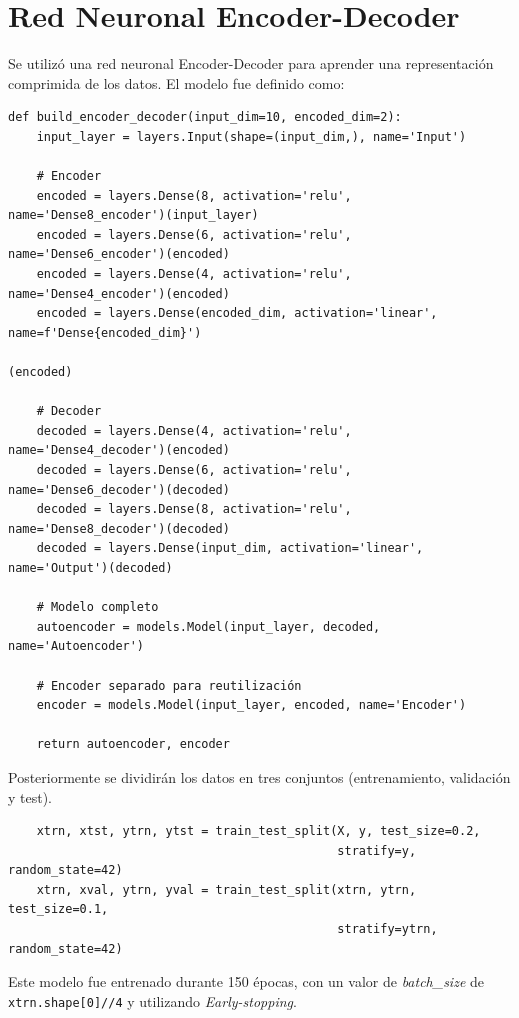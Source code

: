 \documentclass[paper=a4, fontsize=11pt]{scrartcl} %
\numberwithin{equation}{section} %
\numberwithin{figure}{section} %
\numberwithin{table}{section} %
\begin{document}
\section{Red Neuronal Encoder-Decoder}

Se utilizó una red neuronal Encoder-Decoder para aprender una representación comprimida de los datos. El modelo fue definido como:

\begin{verbatim}
def build_encoder_decoder(input_dim=10, encoded_dim=2):
    input_layer = layers.Input(shape=(input_dim,), name='Input')
    
    # Encoder
    encoded = layers.Dense(8, activation='relu', name='Dense8_encoder')(input_layer)
    encoded = layers.Dense(6, activation='relu', name='Dense6_encoder')(encoded)
    encoded = layers.Dense(4, activation='relu', name='Dense4_encoder')(encoded)
    encoded = layers.Dense(encoded_dim, activation='linear', name=f'Dense{encoded_dim}')
                                                                               (encoded)

    # Decoder
    decoded = layers.Dense(4, activation='relu', name='Dense4_decoder')(encoded)
    decoded = layers.Dense(6, activation='relu', name='Dense6_decoder')(decoded)
    decoded = layers.Dense(8, activation='relu', name='Dense8_decoder')(decoded)
    decoded = layers.Dense(input_dim, activation='linear', name='Output')(decoded)
    
    # Modelo completo
    autoencoder = models.Model(input_layer, decoded, name='Autoencoder')
    
    # Encoder separado para reutilización
    encoder = models.Model(input_layer, encoded, name='Encoder')

    return autoencoder, encoder

\end{verbatim}

Posteriormente se dividirán los datos en tres conjuntos (entrenamiento, validación y test). 

\begin{verbatim}
    xtrn, xtst, ytrn, ytst = train_test_split(X, y, test_size=0.2,
                                              stratify=y, random_state=42)
    xtrn, xval, ytrn, yval = train_test_split(xtrn, ytrn, test_size=0.1,
                                              stratify=ytrn, random_state=42)

\end{verbatim}

Este modelo fue entrenado durante 150 épocas, con un valor de \textit{batch\_size} de \lstinline{xtrn.shape[0]//4} y utilizando \textit{Early-stopping}.
\end{document}
